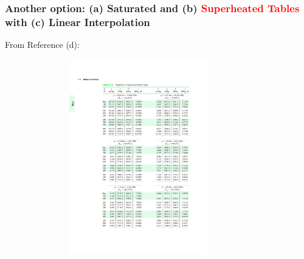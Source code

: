 \documentclass[10pt,compress,handout,ignorenonframetext]{beamer}
\newcommand{\red}{\textcolor{red}}
\begin{document}
\begin{frame}
  \frametitle{Another option: (a) Saturated and (b) \red{Superheated Tables} with (c) Linear Interpolation}
\scriptsize{From Reference (d):}\vspace{-.8cm}
   \begin{center}
   \begin{figure}
      \includegraphics[width=9.5cm,height=8.5cm,clip]{./Pics/Water_SuperheatedTable} 
   \end{figure}
   \end{center}
\end{frame}
\end{document}
